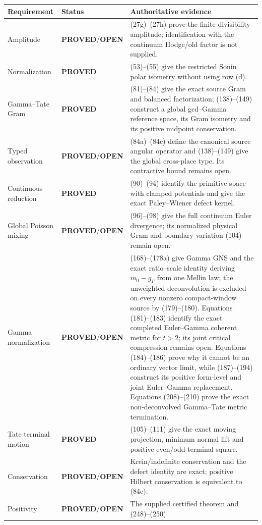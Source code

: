 \documentclass[11pt]{article}
\newcommand{\PROVED}{\textcolor{green!45!black}{\textbf{PROVED}}}
\newcommand{\OPEN}{\textcolor{red!70!black}{\textbf{OPEN}}}
\begin{document}
\begin{center}
\begin{tabular}{p{}p{}p{}}
\hline
Requirement & Status & Authoritative evidence \\
\hline
Amplitude & \PROVED/\OPEN & (27g)--(27h) prove the finite divisibility
amplitude; identification with the continuum Hodge/old factor is not supplied.
\\
Normalization & \PROVED & (53)--(55) give the restricted Sonin polar
isometry without using row (d). \\
Gamma--Tate Gram & \PROVED & (81)--(84) give the exact source Gram and
balanced factorization; (138)--(149) construct a global gcd--Gamma reference
space, its Gram isometry and its positive midpoint conservation. \\
Typed observation & \PROVED/\OPEN & (84a)--(84c) define the canonical source
angular operator and (138)--(149) give the global cross-place type.  Its
contractive bound remains open.
\\
Continuous reduction & \PROVED & (90)--(94) identify the primitive space
with clamped potentials and give the exact Paley--Wiener defect kernel. \\
Global Poisson mixing & \PROVED/\OPEN & (96)--(98) give the full continuum
Euler divergence; its normalized physical Gram and boundary variation (104)
remain open. \\
Gamma normalization & \PROVED/\OPEN & (168)--(178a) give Gamma GNS and the
exact ratio--scale identity deriving $m_0-g_\Gamma$ from one Mellin law;
the unweighted deconvolution is excluded on every nonzero compact-window
source by (179)--(180).  Equations (181)--(183) identify the exact completed
Euler--Gamma coherent metric for $t>2$; its joint critical compression remains
open.  Equations (184)--(186) prove why it cannot be an ordinary vector
limit, while (187)--(194) construct its positive form-level and joint
Euler--Gamma replacement.  Equations (208)--(210) prove the exact
non-deconvolved Gamma--Tate metric termination. \\
Tate terminal motion & \PROVED & (105)--(111) give the exact moving
projection, minimum normal lift and positive even/odd terminal square. \\
Conservation & \PROVED/\OPEN & Krein/indefinite conservation and the defect
identity are exact; positive Hilbert conservation is equivalent to (84c). \\
Positivity & \PROVED/\OPEN & The supplied certified theorem and (248)--(250)

\end{tabular}
\end{center}
\end{document}
